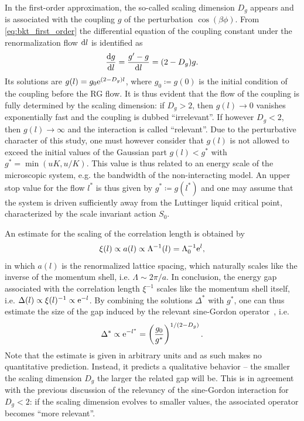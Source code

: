 In the first-order approximation, the so-called scaling dimension $D_g$ appears and is associated with the coupling $g$ of the perturbation $\cos(\beta\phi)$.
From \cref{eq:bkt_first_order} the differential equation of the coupling constant under the renormalization flow $\mathrm d l$ is identified as
\begin{align}
    \frac{\mathrm d g}{\mathrm d l} = \frac{g'-g}{\mathrm d l} = (2-D_g)g.
\end{align}
Its solutions are $g(l) = g_0\mathrm e^{(2-D_g)l}$, where $g_0\coloneqq g(0)$ is the initial condition of the coupling before the RG flow.
It is thus evident that the flow of the coupling is fully determined by the scaling dimension: if $D_g>2$, then $g(l)\rightarrow0$ vanishes exponentially fast and the coupling is dubbed ``irrelevant''.
If however $D_g<2$, then $g(l)\rightarrow\infty$ and the interaction is called ``relevant''.
Due to the perturbative character of this study, one must however consider that $g(l)$ is not allowed to exceed the initial values of the Gaussian part $g(l)<g^*$ with $g^*=\min(uK,u/K)$.
This value is thus related to an energy scale of the microscopic system, e.g. the bandwidth of the non-interacting model.
An upper stop value for the flow $l^*$ is thus given by $g^*\coloneqq g(l^*)$ and one may assume that the system is driven sufficiently away from the Luttinger liquid critical point, characterized by the scale invariant action $S_0$.

An estimate for the scaling of the correlation length is obtained by
\begin{align}
    \xi(l) \propto a(l) \propto \Lambda^{-1}(l) = \Lambda^{-1}_0\mathrm e^{l},
    \label{eq:correlation_length_rg_flow}
\end{align}
in which $a(l)$ is the renormalized lattice spacing, which naturally scales like the inverse of the momentum shell, i.e. $\Lambda\sim2\pi/a$.
In conclusion, the energy gap associated with the correlation length $\xi^{-1}$ scales like the momentum shell itself, i.e. $\Delta(l)\propto\xi(l)^{-1}\propto\mathrm e^{-l}$.
By combining the solutions $\Delta^*$ with $g^*$, one can thus estimate the size of the gap induced by the relevant sine-Gordon operator~\cite{Gogolin2004}, i.e.
\begin{align}
    {\Delta^*}\propto\mathrm e^{-l^*}=\left( \frac{g_0}{g^*} \right)^{1/(2-D_g)}.
\end{align}
Note that the estimate is given in arbitrary units and as such makes no quantitative prediction.
Instead, it predicts a qualitative behavior -- the smaller the scaling dimension $D_g$ the larger the related gap will be.
This is in agreement with the previous discussion of the relevancy of the sine-Gordon interaction for $D_g<2$: if the scaling dimension evolves to smaller values, the associated operator becomes ``more relevant''.

